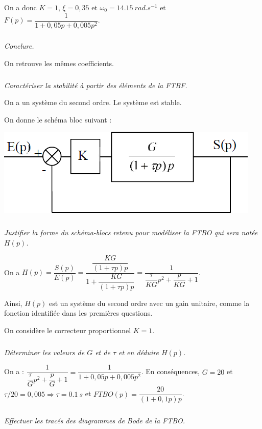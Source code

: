 \documentclass[10pt,fleqn]{article} %
\begin{document}
\begin{multicols}{2}
\begin{corrige}
 On a donc $K=1$, $\xi=0,35$ et $\omega_0=\SI{14,15}{rad.s^{-1}}$ et $F(p)=\dfrac{1}{1+0,05p+0,005p^2}$.

\end{corrige}
\else
\fi

\subparagraph{}\textit{Conclure.}
\ifprof
\begin{corrige}
On retrouve les mêmes coefficients. 
\end{corrige}
\else
\fi

\subparagraph{}\textit{Caractériser la stabilité à partir des éléments de la FTBF.}
\ifprof
\begin{corrige}
On a un système du second ordre. Le système est stable. 
\end{corrige}
\else
\fi
On donne le schéma bloc suivant :

\begin{center}
\includegraphics[width=.6\linewidth]{images/fig_02}
\end{center}

\subparagraph{}\textit{Justifier la forme du schéma-blocs retenu pour modéliser la FTBO qui sera notée $H(p)$.}
\ifprof
\begin{corrige}
On a $H(p)=\dfrac{S(p)}{E(p)}
=\dfrac{\dfrac{KG}{\left(1+\tau p\right)p}}{1+\dfrac{KG}{\left(1+\tau p\right)p}}
=\dfrac{1}{\dfrac{\tau}{KG} p^2+\dfrac{p}{KG}+1}$.

Ainsi, $H(p)$ est un système du second ordre avec un gain unitaire, comme la fonction identifiée dans les premières questions. 
\end{corrige}
\else
\fi

On considère le correcteur proportionnel $K=1$. 
\subparagraph{}\textit{Déterminer les valeurs de $G$ et de $\tau$ et en déduire $H(p)$.}
\ifprof
\begin{corrige}
On a :
$\dfrac{1}{\dfrac{\tau}{G} p^2+\dfrac{p}{G}+1}
= \dfrac{1}{1+0,05p+0,005p^2}$. En conséquences, $G=20$ et $\tau/20=0,005 \Rightarrow \tau=\SI{0,1}{s}$ et $FTBO(p)=\dfrac{20}{(1+0,1p)p}$.

\end{corrige}
\else
\fi

\subparagraph{}\textit{Effectuer les tracés des diagrammes de Bode de la FTBO.}
\ifprof
\begin{corrige}


\end{corrige}
\end{multicols}
\end{document}
